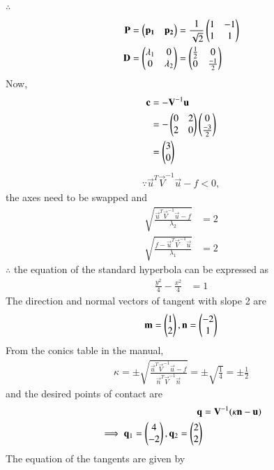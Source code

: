 $\therefore$
\begin{align}
    \mathbf{P} &= \begin{pmatrix}\mathbf{p_1} & \mathbf{p_2}\end{pmatrix} = \frac{1}{\sqrt{2}}\begin{pmatrix}1 & -1 \\ 1 & 1\end{pmatrix}
    \\
    \mathbf{D} &= \begin{pmatrix}\lambda_1 & 0 \\ 0 & \lambda_2\end{pmatrix} = \begin{pmatrix}\frac{1}{2} & 0 \\ 0 & \frac{-1}{2}\end{pmatrix}
\end{align}
Now,
\begin{align}
    \mathbf{c} &= -\mathbf{V}^{-1}\mathbf{u} 
    \\
    &= -\begin{pmatrix}0 & 2 \\2 & 0\end{pmatrix}\begin{pmatrix}0 \\ \frac{-3}{2}\end{pmatrix}
    \\
    &= \begin{pmatrix}3 \\ 0\end{pmatrix}
\end{align}
\begin{align}
\because \vec{u}^T\vec{V}^{-1}\vec{u} - f<0,
\end{align}
the axes need to be swapped and 
\begin{align}
    \sqrt{\frac{ \vec{u}^T\vec{V}^{-1}\vec{u} - f}{\lambda_2}} &= 2
    \\
    \sqrt{ \frac{f- \vec{u}^T\vec{V}^{-1}\vec{u}}{\lambda_1}} &= 2
\end{align}
$\therefore$ the equation of the standard hyperbola can be expressed as 
\begin{align}
    \frac{y^2}{4} - \frac{x^2}{4} &= 1
\end{align}
The direction and normal vectors of tangent with slope 2 are 
\begin{align}
    \mathbf{m}=\begin{pmatrix}1\\2\end{pmatrix},\mathbf{n}=\begin{pmatrix}-2\\1\end{pmatrix}
\end{align}
From the  conics table in the manual,
\begin{align}
\kappa = \pm \sqrt{\frac{\vec{u}^T\vec{V}^{-1}\vec{u}-f}{\vec{n}^T\vec{V}^{-1}\vec{n}}} = \pm \sqrt{\frac{1}{4}} = \pm \frac{1}{2}
\end{align}
and the desired points of contact are 
\begin{align}
\mathbf{q}&=\mathbf{V}^{-1}(\kappa\mathbf{n}-\mathbf{u})\\
\implies \mathbf{q}_1=\begin{pmatrix}4\\-2\end{pmatrix}, 
\mathbf{q}_2=\begin{pmatrix}2\\2\end{pmatrix}\label{quadform/41/eq:10}
\end{align}
The equation of the tangents are given by
